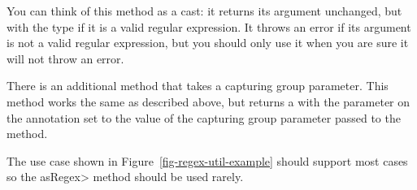 You can think of this method
as a cast:  it returns its argument unchanged, but with the type
 if it is a valid regular expression.  It throws an
error if its argument is not a valid regular expression, but you should
only use it when you are sure it will not throw an error.

There is an additional 
method that takes a capturing group parameter. This method works the same as
described above, but returns a  with the parameter on the
annotation set to the value of the capturing group parameter passed to the method.

The use case shown in Figure~\ref{fig-regex-util-example} should support most cases
so the \<asRegex> method should be used rarely.




